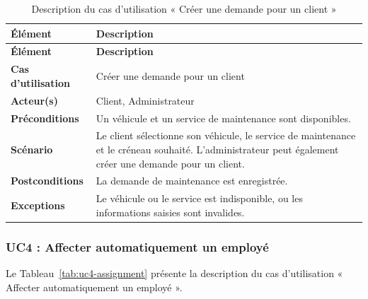 \begin{longtable}{|>{\RaggedRight\arraybackslash}p{4cm}|>{\RaggedRight\arraybackslash}p{10.5cm}|}

\caption{Description du cas d'utilisation « Créer une demande pour un client »}
\label{tab:uc3-request}\\

\hline
\textbf{Élément} & \textbf{Description} \\
\hline
\endfirsthead

\hline
\textbf{Élément} & \textbf{Description} \\
\hline
\endhead

\textbf{Cas d'utilisation} &
Créer une demande pour un client \\
\hline

\textbf{Acteur(s)} &
Client, Administrateur \\
\hline

\textbf{Préconditions} &
Un véhicule et un service de maintenance sont disponibles. \\
\hline

\textbf{Scénario} &
Le client sélectionne son véhicule, le service de maintenance et le créneau souhaité. L'administrateur peut également créer une demande pour un client. \\
\hline

\textbf{Postconditions} &
La demande de maintenance est enregistrée. \\
\hline

\textbf{Exceptions} &
Le véhicule ou le service est indisponible, ou les informations saisies sont invalides. \\
\hline

\end{longtable}


\subsubsection{UC4 : Affecter automatiquement un employé}

Le Tableau~\ref{tab:uc4-assignment} présente la description du cas d'utilisation « Affecter automatiquement un employé ».

